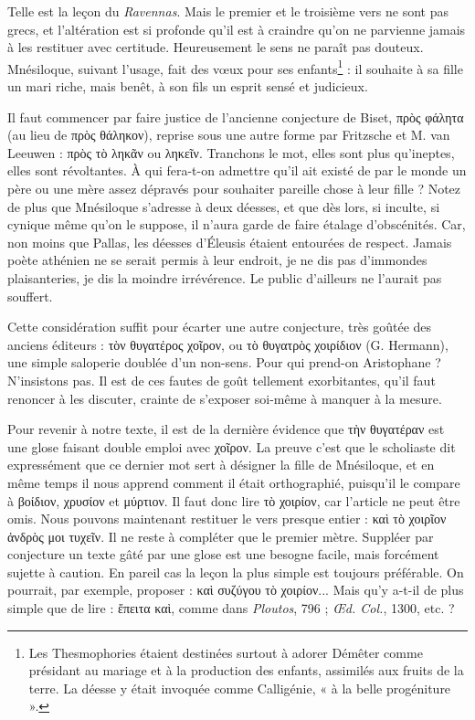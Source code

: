 \documentclass{book}%
\newcommand{\italique}[1]{\textit{#1}}%
\newcommand{\note}[1]{\footnote{#1}}
\begin{document}
Telle est la leçon du \italique{Ravennas}. Mais le premier et le troisième vers ne sont pas grecs, et l'altération est si profonde qu'il est à craindre qu'on ne parvienne jamais à les restituer avec certitude. Heureusement le sens ne paraît pas douteux. Mnésiloque, suivant l'usage, fait des vœux pour ses enfants\note{Les Thesmophories étaient destinées surtout à adorer Démêter comme présidant au mariage et à la production des enfants, assimilés aux fruits de la terre. La déesse y était invoquée comme Calligénie, « à la belle progéniture ».} : il souhaite à sa fille un mari riche, mais benêt, à son fils un esprit sensé et judicieux. 

Il faut commencer par faire justice de l'ancienne conjecture de Biset, πρὸς φάλητα (au lieu de πρὸς θάληκον), reprise sous une autre forme par Fritzsche et M. van Leeuwen : πρὸς τὸ ληκᾶν ou ληκεῖν. 
Tranchons le mot, elles sont plus qu'ineptes, elles sont révoltantes. À qui fera-t-on admettre qu'il ait existé de par le monde un père ou une mère assez dépravés pour souhaiter pareille chose à leur fille ? Notez de plus que Mnésiloque s'adresse à deux déesses, et que dès lors, si inculte, si cynique même qu'on le suppose, il n'aura garde de faire étalage d'obscénités. Car, non moins que Pallas, les déesses d'Éleusis étaient entourées de respect. Jamais poète athénien ne se serait permis à leur endroit, je ne dis pas d'immondes plaisanteries, je dis la moindre irrévérence. 
Le public d'ailleurs ne l'aurait pas souffert. 

Cette considération suffit pour écarter une autre conjecture, très goûtée des anciens éditeurs : τὸν θυγατέρος χοῖρον, ou τὸ θυγατρὸς χοιρίδιον (G. Hermann), une simple saloperie doublée d'un non-sens. Pour qui prend-on Aristophane ? N'insistons pas. Il est de ces fautes de goût tellement exorbitantes, qu'il faut renoncer à les discuter, crainte de s'exposer soi-même à manquer à la mesure. 

Pour revenir à notre texte, il est de la dernière évidence que τὴν θυγατέραν est une glose faisant double emploi avec χοῖρον. 
La preuve c'est que le scholiaste dit expressément que ce dernier mot sert à désigner la fille de Mnésiloque, et en même temps il nous apprend comment il était orthographié, puisqu'il le compare à βοίδιον, χρυσίον et μύρτιον. 
Il faut donc lire τὸ χοιρίον, car l'article ne peut être omis. 
Nous pouvons maintenant restituer le vers presque entier : καὶ τὸ χοιρῖον ἀνδρὸς μοι τυχεῖν. Il ne reste à compléter que le premier mètre. Suppléer par conjecture un texte gâté par une glose est une besogne facile, mais forcément sujette à caution. 
En pareil cas la leçon la plus simple est toujours préférable. 
On pourrait, par exemple, proposer : καὶ συζύγου τὸ χοιρίον... Mais qu'y a-t-il de plus simple que de lire : ἔπειτα καὶ, comme dans \italique{Ploutos}, 796 ; \italique{Œd. Col.}, 1300, etc. ? 
\end{document}
